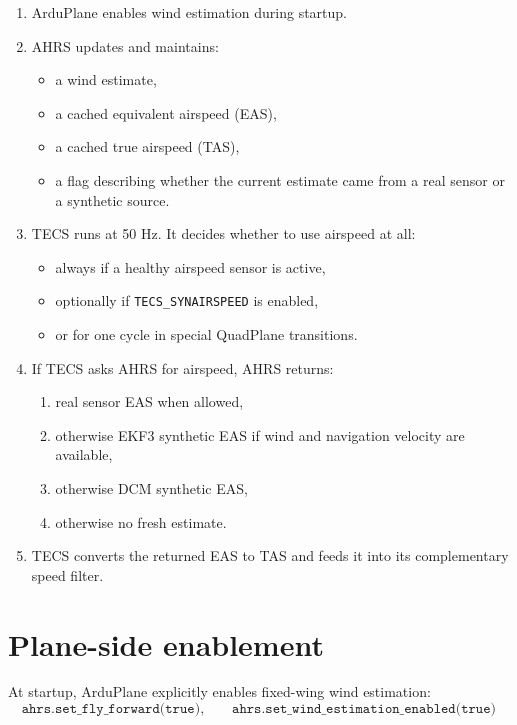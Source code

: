 \documentclass[11pt]{article}
\begin{document}
\begin{enumerate}
    \item ArduPlane enables wind estimation during startup.
    \item AHRS updates and maintains:
    \begin{itemize}
        \item a wind estimate,
        \item a cached equivalent airspeed (EAS),
        \item a cached true airspeed (TAS),
        \item a flag describing whether the current estimate came from a real sensor or a synthetic source.
    \end{itemize}
    \item TECS runs at 50 Hz. It decides whether to use airspeed at all:
    \begin{itemize}
        \item always if a healthy airspeed sensor is active,
        \item optionally if \texttt{TECS\_SYNAIRSPEED} is enabled,
        \item or for one cycle in special QuadPlane transitions.
    \end{itemize}
    \item If TECS asks AHRS for airspeed, AHRS returns:
    \begin{enumerate}
        \item real sensor EAS when allowed,
        \item otherwise EKF3 synthetic EAS if wind and navigation velocity are available,
        \item otherwise DCM synthetic EAS,
        \item otherwise no fresh estimate.
    \end{enumerate}
    \item TECS converts the returned EAS to TAS and feeds it into its complementary speed filter.
\end{enumerate}

\section{Plane-side enablement}

At startup, ArduPlane explicitly enables fixed-wing wind estimation:
\begin{equation}
\texttt{ahrs.set\_fly\_forward(true)}, \qquad
\texttt{ahrs.set\_wind\_estimation\_enabled(true)}
\end{equation}
\end{document}
